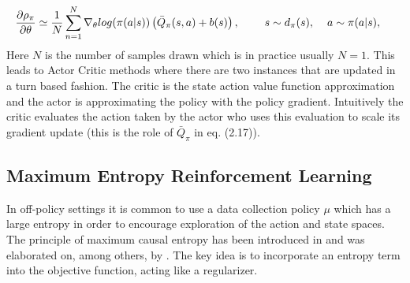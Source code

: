 \begin{align}
\frac{\partial\rho_\pi}{\partial\theta} \simeq \frac{1}{N}\sum_{n=1}^N \nabla_\theta log (\pi(a|s))\left( \bar{Q}_\pi(s,a)+b(s)\right),\text{\hspace{8mm}} s\sim d_\pi(s), \text{\hspace{4mm}} a\sim \pi(a|s), \text{\hspace{4mm}}
\end{align}
Here $N$ is the number of samples drawn which is in practice usually $N=1$.
This leads to Actor Critic methods where there are two instances that are updated in a turn based fashion. The critic is the state action value function approximation and the actor is approximating the policy with the policy gradient. Intuitively the critic evaluates the action taken by the actor who uses this evaluation to scale its gradient update (this is the role of $\bar{Q}_\pi$ in eq. (2.17)).

\subsection{Maximum Entropy Reinforcement Learning}
In off-policy settings it is common to use a data collection policy $\mu$ which has a large entropy in order to encourage exploration of the action and state spaces. The principle of maximum causal entropy has been introduced in \cite{AAAIziebert} and was elaborated on, among others, by \cite{DBLP:journals/corr/HaarnojaTAL17}. The key idea is to incorporate an entropy term into the objective function, acting like a regularizer. 

